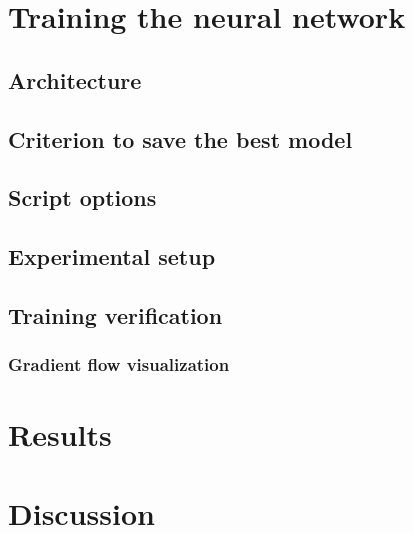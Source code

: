 \section{Training the neural network}
\subsection{Architecture}
\subsection{Criterion to save the best model}
\subsection{Script options}
\subsection{Experimental setup}
\subsection{Training verification}
\subsubsection{Gradient flow visualization}

\section{Results}

\section{Discussion}